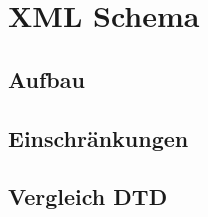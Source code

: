\chapter{XML Schema}
\label{cha:Schema}

\section{Aufbau}

\section{Einschränkungen}

\section{Vergleich DTD}